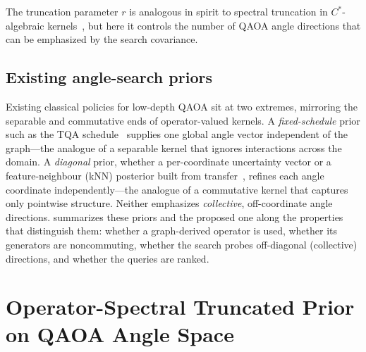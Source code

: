 \documentclass[aps,prxquantum,reprint,amsmath,amssymb,floatfix,nofootinbib,superscriptaddress,longbibliography]{revtex4-2}
\theoremstyle{remark}
\newcommand{\QAOA}{\textnormal{\textsc{QAOA}}}
\newcommand{\OSTQAOA}{\textnormal{\textsc{OST-QAOA}}}
\newcommand{\TQA}{\textnormal{\textsc{TQA}}}
\begin{document}
The truncation parameter \(r\) is analogous in spirit to spectral truncation in
\(C^*\)-algebraic kernels~\cite{hashimoto2024spectral}, but here it controls the
number of QAOA angle directions that can be emphasized by the search covariance.

\subsection{Existing angle-search priors}
\label{sec:existing}

Existing classical policies for low-depth \QAOA{} sit at two extremes, mirroring
the separable and commutative ends of operator-valued kernels.  A
\emph{fixed-schedule} prior such as the \TQA{} schedule~\cite{sack2021} supplies
one global angle vector independent of the graph---the analogue of a separable
kernel that ignores interactions across the domain.  A \emph{diagonal} prior,
whether a per-coordinate uncertainty vector or a feature-neighbour (kNN)
posterior built from transfer~\cite{galda2021,shaydulin2023transfer}, refines
each angle coordinate independently---the analogue of a commutative kernel that
captures only pointwise structure.  Neither emphasizes \emph{collective},
off-coordinate angle directions.   summarizes these priors and
the proposed one along the properties that distinguish them: whether a
graph-derived operator is used, whether its generators are noncommuting, whether
the search probes off-diagonal (collective) directions, and whether the queries
are ranked.

\begin{table}[t]
\centering
\caption{Summary of the existing and the proposed angle-search priors.
The proposed \OSTQAOA{} prior is the only one that builds a graph-derived
operator from noncommuting generators and searches its off-diagonal collective
directions under a ranked query budget; the diagonal and fixed-schedule priors
are its commutative and separable special cases (\cref{prop:limit}).}
\label{tab:summary}

\end{table}

\section{Operator-Spectral Truncated Prior on QAOA Angle Space}
\label{sec:method}
\end{document}
